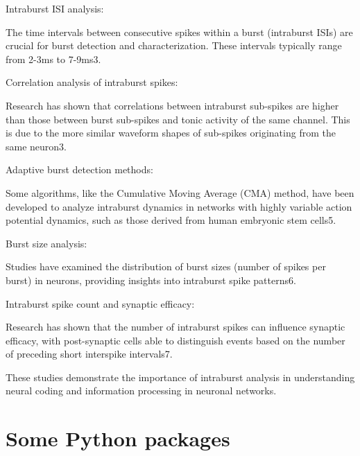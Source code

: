 \documentclass[a4paper,9pt]{extarticle}
\begin{document}
Intraburst ISI analysis:

The time intervals between consecutive spikes within a burst (intraburst ISIs) are crucial for burst detection and characterization. These intervals typically range from 2-3ms to 7-9ms3.

Correlation analysis of intraburst spikes:

Research has shown that correlations between intraburst sub-spikes are higher than those between burst sub-spikes and tonic activity of the same channel. This is due to the more similar waveform shapes of sub-spikes originating from the same neuron3.

Adaptive burst detection methods:

Some algorithms, like the Cumulative Moving Average (CMA) method, have been developed to analyze intraburst dynamics in networks with highly variable action potential dynamics, such as those derived from human embryonic stem cells5.

Burst size analysis:

Studies have examined the distribution of burst sizes (number of spikes per burst) in neurons, providing insights into intraburst spike patterns6.

Intraburst spike count and synaptic efficacy:

Research has shown that the number of intraburst spikes can influence synaptic efficacy, with post-synaptic cells able to distinguish events based on the number of preceding short interspike intervals7.

These studies demonstrate the importance of intraburst analysis in understanding neural coding and information processing in neuronal networks.




\section{Some Python packages}
\end{document}
